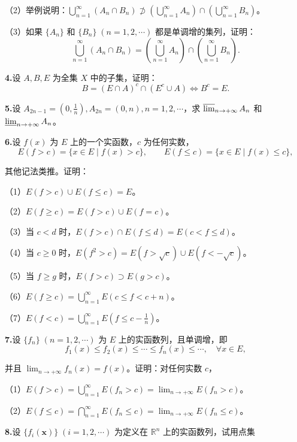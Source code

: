 \documentclass[11pt,a4paper]{article}
\begin{document}
\par\noindent （2）举例说明：$\bigcup_{n=1}^\infty(A_n\cap B_n)\not\supset\left(\bigcup_{n=1}^\infty A_n\right)\cap\left(\bigcup_{n=1}^\infty B_n\right)$。
\par\noindent （3）如果 $\{A_n\}$ 和 $\{B_n\}\;(n=1,2,\cdots)$ 都是单调增的集列，证明：
\[\bigcup_{n=1}^\infty(A_n\cap B_n)=\left(\bigcup_{n=1}^\infty A_n\right)\cap\left(\bigcup_{n=1}^\infty B_n\right).\]
\par{}\noindent\textbf{4.}\quad 设 $A,B,E$ 为全集 $X$ 中的子集，证明：
\[B=(E\cap A)^c\cap(E^c\cup A)\Leftrightarrow B^c=E.\]
\par{}\noindent\textbf{5.}\quad 设 $A_{2n-1}=\left(0,\frac1n\right),A_{2n}=(0,n),n=1,2,\cdots$，求 $\varlimsup_{n\to+\infty} A_n$ 和 $\varliminf_{n\to+\infty} A_n$。
\par{}\noindent\textbf{6.}\quad 设 $f(x)$ 为 $E$ 上的一个实函数，$c$ 为任何实数，
\[E(f>c)=\{x\in E\mid f(x)>c\},\qquad E(f\leq c)=\{x\in E\mid f(x)\leq c\},\]
\par\noindent 其他记法类推。证明：
\par\noindent （1）$E(f>c)\cup E(f\leq c)=E$。
\par\noindent （2）$E(f\geq c)=E(f>c)\cup E(f=c)$。
\par\noindent （3）当 $c<d$ 时，$E(f>c)\cap E(f\leq d)=E(c<f\leq d)$。
\par\noindent （4）当 $c\geq0$ 时，$E(f^2>c)=E(f>\sqrt c)\cup E(f<-\sqrt c)$。
\par\noindent （5）当 $f\geq g$ 时，$E(f>c)\supset E(g>c)$。
\par\noindent （6）$E(f\geq c)=\bigcup_{n=1}^\infty E(c\leq f<c+n)$。
\par\noindent （7）$E(f<c)=\bigcup_{n=1}^\infty E\left(f\leq c-\frac1n\right)$。
\par{}\noindent\textbf{7.}\quad 设 $\{f_n\}\;(n=1,2,\cdots)$ 为 $E$ 上的实函数列，且单调增，即
\[f_1(x)\leq f_2(x)\leq\cdots\leq f_n(x)\leq\cdots,\quad \forall x\in E,\]
\par\noindent 并且 $\lim_{n\to+\infty}f_n(x)=f(x)$。证明：对任何实数 $c$，
\par\noindent （1）$E(f>c)=\bigcup_{n=1}^\infty E(f_n>c)=\lim_{n\to+\infty}E(f_n>c)$。
\par\noindent （2）$E(f\leq c)=\bigcap_{n=1}^\infty E(f_n\leq c)=\lim_{n\to+\infty}E(f_n\leq c)$。
\par{}\noindent\textbf{8.}\quad 设 $\{f_i(\boldsymbol{x})\}\;(i=1,2,\cdots)$ 为定义在 $\mathbb R^n$ 上的实函数列，试用点集
\end{document}
